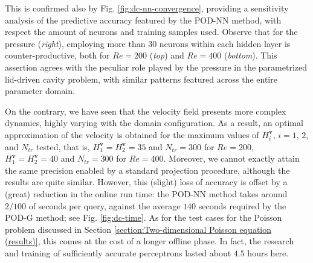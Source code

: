 \documentclass[12pt, a4paper, twoside, openright, notitlepage]{report}
\numberwithin{equation}{chapter}
\theoremstyle{theorem}
\theoremstyle{definition}
\theoremstyle{remark}
\theoremstyle{proposition}
\numberwithin{figure}{chapter}
\newcommand{\bg}[1]{\boldsymbol{#1}}
\begin{document}
		This is confirmed also by Fig. \ref{fig:dc-nn-convergence}, providing a sensitivity analysis of the predictive accuracy featured by the POD-NN method, with respect the amount of neurons and training samples used. Observe that for the pressure (\emph{right}), employing more than $30$ neurons within each hidden layer is counter-productive, both for $Re = 200$ (\emph{top}) and $Re = 400$ (\emph{bottom}). This assertion agrees with the peculiar role played by the pressure in the parametrized lid-driven cavity problem, with similar patterns featured across the entire parameter domain. 
		
		On the contrary, we have seen that the velocity field presents more complex dynamics, highly varying with the domain configuration. As a result, an optimal approximation of the velocity is obtained for the maximum values of $H_i^{\bg{v}}$, $i = 1, \, 2$, and $N_{tr}$ tested, that is, $H_1^{\bg{v}} = H_2^{\bg{v}} = 35$ and $N_{tr} = 300$ for $Re = 200$, $H_1^{\bg{v}} = H_2^{\bg{v}} = 40$ and $N_{tr} = 300$ for $Re = 400$. Moreover, we cannot exactly attain the same precision enabled by a standard projection procedure, although the results are quite similar. However, this (slight) loss of accuracy is offset by a (great) reduction in the online run time: the POD-NN method takes around $2/100$ of seconds per query, against the average $140$ seconds required by the POD-G method; see Fig. \ref{fig:dc-time}. As for the test cases for the Poisson problem discussed in Section \ref{section:Two-dimensional Poisson equation (results)}, this comes at the cost of a longer offline phase. In fact, the research and training of sufficiently accurate perceptrons lasted about $4.5$ hours here.
		
		\clearpage
		
		\vspace*{-1.4cm}
						
\end{document}
